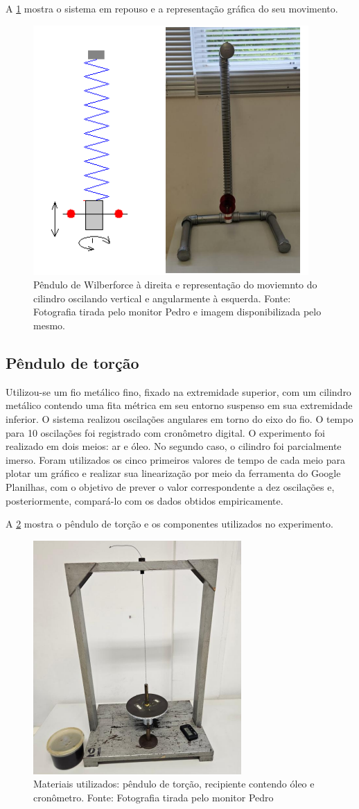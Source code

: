 A \cref{fig:wilberforce} mostra o sistema em repouso e a representação gráfica do seu movimento.

\begin{figure}[H]
    \centering
    \includegraphics[width=0.35\linewidth]{fig/wilberforce.png}
    \caption{Pêndulo de Wilberforce à direita e representação do moviemnto do cilindro oscilando vertical e angularmente à esquerda. Fonte: Fotografia tirada pelo monitor Pedro e imagem disponibilizada pelo mesmo.}
    \label{fig:wilberforce}
\end{figure}

\subsection{Pêndulo de torção}

Utilizou-se um fio metálico fino, fixado na extremidade superior, com um cilindro metálico contendo uma fita métrica em seu entorno suspenso em sua extremidade inferior. O sistema realizou oscilações angulares em torno do eixo do fio. O tempo para 10 oscilações foi registrado com cronômetro digital. O experimento foi realizado em dois meios: ar e óleo. No segundo caso, o cilindro foi parcialmente imerso. Foram utilizados os cinco primeiros valores de tempo de cada meio para plotar um gráfico e realizar sua linearização por meio da ferramenta do Google Planilhas, com o objetivo de prever o valor correspondente a dez oscilações e, posteriormente, compará-lo com os dados obtidos empiricamente.

A \cref{fig:torsao} mostra o pêndulo de torção e os componentes utilizados no experimento.

\begin{figure}[H]
    \centering
    \includegraphics[width=0.35\linewidth]{fig/torsao.png}
    \caption{Materiais utilizados: pêndulo de torção, recipiente contendo óleo e cronômetro. Fonte: Fotografia tirada pelo monitor Pedro}
    \label{fig:torsao}
\end{figure}

